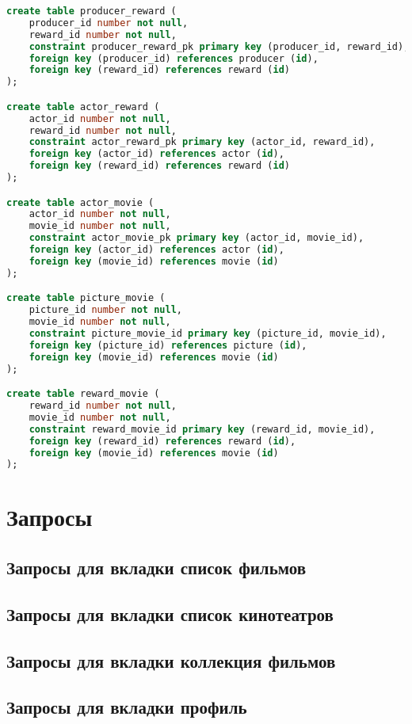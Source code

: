 \documentclass[a4paper,16pt]{article}
\begin{document}
\begin{lstlisting}[language=SQL]
create table producer_reward (
    producer_id number not null,
    reward_id number not null, 
    constraint producer_reward_pk primary key (producer_id, reward_id),
    foreign key (producer_id) references producer (id),
    foreign key (reward_id) references reward (id)
);

create table actor_reward (
    actor_id number not null,
    reward_id number not null,
    constraint actor_reward_pk primary key (actor_id, reward_id),
    foreign key (actor_id) references actor (id),
    foreign key (reward_id) references reward (id)
);

create table actor_movie (
    actor_id number not null,
    movie_id number not null,
    constraint actor_movie_pk primary key (actor_id, movie_id),
    foreign key (actor_id) references actor (id),
    foreign key (movie_id) references movie (id)
);

create table picture_movie (
    picture_id number not null,
    movie_id number not null,
    constraint picture_movie_id primary key (picture_id, movie_id),
    foreign key (picture_id) references picture (id),
    foreign key (movie_id) references movie (id)
);

create table reward_movie (
    reward_id number not null,
    movie_id number not null,
    constraint reward_movie_id primary key (reward_id, movie_id),
    foreign key (reward_id) references reward (id),
    foreign key (movie_id) references movie (id)
);
\end{lstlisting}

\section{Запросы}
\subsection{Запросы для вкладки список фильмов}
\subsection{Запросы для вкладки список кинотеатров}
\subsection{Запросы для вкладки коллекция фильмов}
\subsection{Запросы для вкладки профиль}
\end{document}
